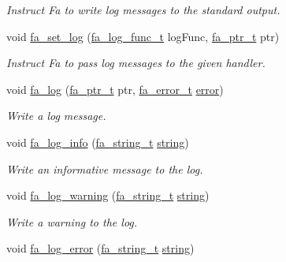 \begin{DoxyCompactItemize}
\begin{DoxyCompactList}\small\item\em Instruct Fa to write log messages to the standard output. \end{DoxyCompactList}\item 
void \hyperlink{group___fa_fa_ga97a486eb85c974972eebfd7d69eaa8c3}{fa\-\_\-set\-\_\-log} (\hyperlink{group___fa_fa_ga1f914d0c16f566e96a08db3a3446aab7}{fa\-\_\-log\-\_\-func\-\_\-t} log\-Func, \hyperlink{group___fa_ga915ddeae99ad7568b273d2b876425197}{fa\-\_\-ptr\-\_\-t} ptr)
\begin{DoxyCompactList}\small\item\em Instruct Fa to pass log messages to the given handler. \end{DoxyCompactList}\item 
void \hyperlink{group___fa_fa_ga9567a792b3679742c7ab6535c368be60}{fa\-\_\-log} (\hyperlink{group___fa_ga915ddeae99ad7568b273d2b876425197}{fa\-\_\-ptr\-\_\-t} ptr, \hyperlink{group___fa_error_ga4a4feb4d3686657ac8dbd2be421cbb15}{fa\-\_\-error\-\_\-t} \hyperlink{group___fa_error_gga5cf5c13f1e12ae6b125c0265f59f4d82ad606e435413ea0944dd00d49e901e4ed}{error})
\begin{DoxyCompactList}\small\item\em Write a log message. \end{DoxyCompactList}\item 
void \hyperlink{group___fa_fa_ga7d0eec2d02accbcf65148ea41e680b1e}{fa\-\_\-log\-\_\-info} (\hyperlink{group___fa_string_gacada63033b77bc6c39fa632ae199349b}{fa\-\_\-string\-\_\-t} \hyperlink{util_8h_a41106000aac73b61e4fc2ef9dd39a603}{string})
\begin{DoxyCompactList}\small\item\em Write an informative message to the log. \end{DoxyCompactList}\item 
void \hyperlink{group___fa_fa_gaadbae9a73993245706ca501b11b531ec}{fa\-\_\-log\-\_\-warning} (\hyperlink{group___fa_string_gacada63033b77bc6c39fa632ae199349b}{fa\-\_\-string\-\_\-t} \hyperlink{util_8h_a41106000aac73b61e4fc2ef9dd39a603}{string})
\begin{DoxyCompactList}\small\item\em Write a warning to the log. \end{DoxyCompactList}\item 
void \hyperlink{group___fa_fa_gaf6025219b330102e95a473aa2450bd7f}{fa\-\_\-log\-\_\-error} (\hyperlink{group___fa_string_gacada63033b77bc6c39fa632ae199349b}{fa\-\_\-string\-\_\-t} \hyperlink{util_8h_a41106000aac73b61e4fc2ef9dd39a603}{string})

\end{DoxyCompactItemize}
